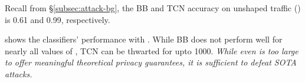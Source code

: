 Recall from \S\ref{subsec:attack-bg}, the BB and TCN accuracy on unshaped
traffic ({\base}) is 0.61 and 0.99, respectively.

 shows the classifiers' performance with {\sys}.
While BB does not perform well for nearly all values of \update{$\varepsilon$},
TCN can be thwarted for \update{$\varepsilon$} upto 1000.
%
{\em While even  is too
large to offer meaningful theoretical privacy guarantees, it is sufficient to
defeat SOTA attacks.}

%

